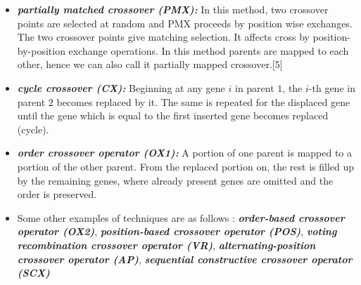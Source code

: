 \documentclass[a4paper, 12pt]{article}
\begin{document}
\begin{itemize}
\item  \textbf{\textit{partially matched crossover (PMX):}} In this method, two crossover points are selected at random and PMX proceeds by position wise exchanges. The two crossover points give matching selection. It affects cross by position-by-position exchange operations. In this method parents are mapped to each other, hence we can also call it partially mapped crossover.[5]
\item  \textbf{\textit{cycle crossover (CX):}} Beginning at any gene $i$ in parent $1$, the $i$-th gene in parent $2$ becomes replaced by it. The same is repeated for the displaced gene until the gene which is equal to the first inserted gene becomes replaced (cycle).
\item  \textbf{\textit{order crossover operator (OX1):}} A portion of one parent is mapped to a portion of the other parent. From the replaced portion on, the rest is filled up by the remaining genes, where already present genes are omitted and the order is preserved.
\item Some other examples of techniques are as follows : \textbf{\textit{order-based crossover operator (OX2)}}, \textbf{\textit{position-based crossover operator (POS)}}, \textbf{\textit{voting recombination crossover operator (VR)}}, \textbf{\textit{alternating-position crossover operator (AP)}}, \textbf{\textit{sequential constructive crossover operator (SCX)}}
\end{itemize}
\end{document}

